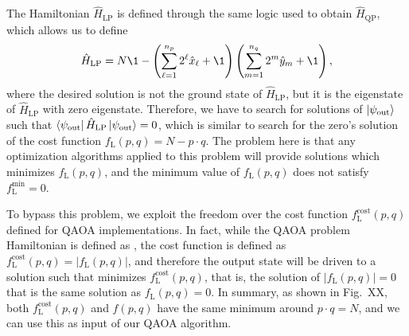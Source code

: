 The Hamiltonian $\hat{H}_{\mathrm{LP}}$ is defined through the same logic used to obtain $\hat{H}_{\mathrm{QP}}$, which allows us to define
\begin{equation}
	\hat{H}_{\mathrm{LP}} = N\1 - \left(\sum_{\ell=1}^{n_p} 2^{\ell} \hat{x}_{\ell} + \1 \right)\left(\sum_{m=1}^{n_q} 2^{m} \hat{y}_{m} + \1 \right) ,
\end{equation}
where the desired solution is not the ground state of $\hat{H}_{\mathrm{LP}}$, but it is the eigenstate of $\hat{H}_{\mathrm{LP}}$ with zero eigenstate. Therefore, we have to search for solutions of $\ket{\psi_{\mathrm{out}}}$ such that $\bra{\psi_{\mathrm{out}}}\hat{H}_{\mathrm{LP}}\ket{\psi_{\mathrm{out}}} = 0$, which is similar to search for the zero's solution of the cost function $f_{\mathrm{L}}(p,q) = N - p \cdot q$. The problem here is that any optimization algorithms applied to this problem will provide solutions which minimizes $f_{\mathrm{L}}(p,q)$, and the minimum value of $f_{\mathrm{L}}(p,q)$ does not satisfy $f_{\mathrm{L}}^{\mathrm{min}} = 0$. 

To bypass this problem, we exploit the freedom over the cost function $f^{\mathrm{cost}}_{\mathrm{L}}(p,q)$ defined for QAOA implementations. In fact, while the QAOA problem Hamiltonian is defined as , the cost function is defined as $f^{\mathrm{cost}}_{\mathrm{L}}(p,q) = |f_{\mathrm{L}}(p,q)|$, and therefore the output state will be driven to a solution such that minimizes $f^{\mathrm{cost}}_{\mathrm{L}}(p,q)$, that is, the solution of $|f_{\mathrm{L}}(p,q)|=0$ that is the same solution as $f_{\mathrm{L}}(p,q)=0$. In summary, as shown in Fig.~XX, both $f^{\mathrm{cost}}_{\mathrm{L}}(p,q)$ and $f(p,q)$ have the same minimum around $p \cdot q = N$, and we can use this as input of our QAOA algorithm.

